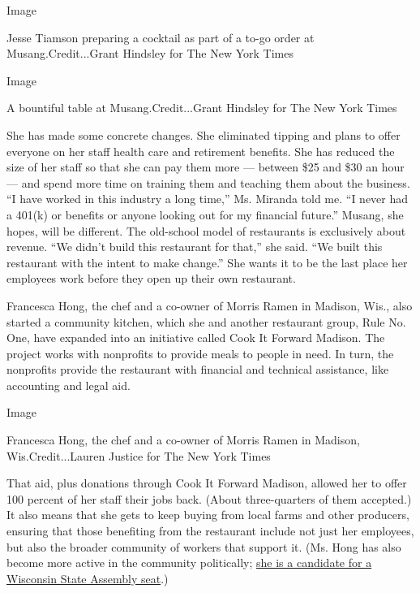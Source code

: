 Image

Jesse Tiamson preparing a cocktail as part of a to-go order at
Musang.Credit...Grant Hindsley for The New York Times

Image

A bountiful table at Musang.Credit...Grant Hindsley for The New York
Times

She has made some concrete changes. She eliminated tipping and plans to
offer everyone on her staff health care and retirement benefits. She has
reduced the size of her staff so that she can pay them more --- between
\$25 and \$30 an hour --- and spend more time on training them and
teaching them about the business. ``I have worked in this industry a
long time,'' Ms. Miranda told me. ``I never had a 401(k) or benefits or
anyone looking out for my financial future.'' Musang, she hopes, will be
different. The old-school model of restaurants is exclusively about
revenue. ``We didn't build this restaurant for that,'' she said. ``We
built this restaurant with the intent to make change.'' She wants it to
be the last place her employees work before they open up their own
restaurant.

Francesca Hong, the chef and a co-owner of Morris Ramen in Madison,
Wis., also started a community kitchen, which she and another restaurant
group, Rule No. One, have expanded into an initiative called Cook It
Forward Madison. The project works with nonprofits to provide meals to
people in need. In turn, the nonprofits provide the restaurant with
financial and technical assistance, like accounting and legal aid.

Image

Francesca Hong, the chef and a co-owner of Morris Ramen in Madison,
Wis.Credit...Lauren Justice for The New York Times

That aid, plus donations through Cook It Forward Madison, allowed her to
offer 100 percent of her staff their jobs back. (About three-quarters of
them accepted.) It also means that she gets to keep buying from local
farms and other producers, ensuring that those benefiting from the
restaurant include not just her employees, but also the broader
community of workers that support it. (Ms. Hong has also become more
active in the community politically;
\href{https://madison.com/wsj/news/local/govt-and-politics/francesca-hong-wins-packed-race-for-assembly-district-76-on-madisons-liberal-isthmus/article_17c27bb6-46da-526f-9c09-5e4a7d3bda10.html}{she
is a candidate for a Wisconsin State Assembly seat}.)

